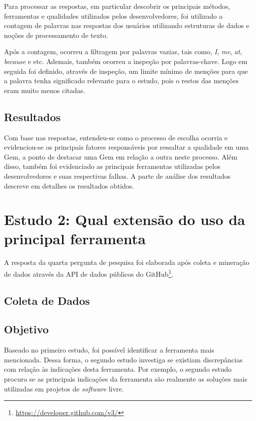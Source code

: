 Para processar as respostas, em particular descobrir os principais métodos, ferramentas e qualidades utilizados pelos desenvolvedores, foi utilizado a contagem de palavras nas respostas dos usuários utilizando estruturas de dados e noções de processamento de texto.

Após a contagem, ocorreu a filtragem por palavras vazias, tais como, \textit{I}, \textit{me}, \textit{at}, \textit{because} e etc. Ademais, também ocorreu a inspeção por palavras-chave. Logo em seguida foi definido, através de inspeção, um limite mínimo de menções para que a palavra tenha significado relevante para o estudo, pois o restos das menções eram muito menos citadas.

\subsection{Resultados}

Com base nas respostas, entendeu-se como o processo de escolha ocorria e evidenciou-se os principais fatores responsáveis por ressaltar a qualidade em uma Gem, a ponto de destacar uma Gem em relação a outra neste processo. Além disso, também foi evidenciado as principais ferramentas utilizadas pelos desenvolvedores e suas respectivas falhas. A parte de análise dos resultados descreve em detalhes os resultados obtidos.

\section{Estudo 2: Qual extensão do uso da principal ferramenta}

A resposta da quarta pergunta de pesquisa foi elaborada após coleta e mineração de dados através da API de dados públicos do GitHub\footnote{\url{https://developer.github.com/v3/}}. 

\subsection{Coleta de Dados}

\subsection{Objetivo}

Baseado no primeiro estudo, foi possível identificar a ferramenta mais mencionada. Dessa forma, o segundo estudo investiga se existiam discrepâncias com relação às indicações desta ferramenta. Por exemplo, o segundo estudo procura se as principais indicações da ferramenta são realmente as soluções mais utilizadas em projetos de \textit{software} livre.

